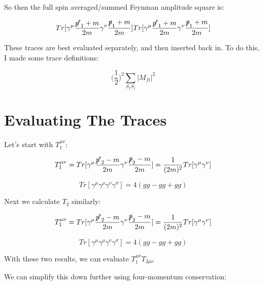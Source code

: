 \documentclass[a4]{article}
\begin{document}
    So then the full spin averaged/summed Feynman amplitude square is:

    \begin{framed}
        \begin{equation}
            Tr [\gamma^\mu \frac{\slashed{p'}_1 + m}{2m} \gamma^\nu \frac{\slashed{p}_1 + m}{2 m}] Tr [\gamma^\mu \frac{\slashed{p'}_1 + m}{2m} \gamma^\nu \frac{\slashed{p}_1 + m}{2 m}]
        \end{equation}
    \end{framed}

    These traces are best evaluated separately, and then inserted back in. To do this, I made some trace definitions:

    \begin{equation}
        \bigg( \frac{1}{2} \bigg)^2 \sum_{S_f S_i} |M_{f i}|^2
    \end{equation}

    \section*{Evaluating The Traces}

    Let's start with $T_1^{\mu \nu}$:

    \begin{equation}
        T_1^{\mu \nu} = Tr [\gamma^\mu \frac{\slashed{p'}_2 - m}{2m} \gamma^\nu \frac{\slashed{p}_2 - m}{2 m}] = \frac{1}{(2m)^2} Tr[\gamma^\mu \gamma^\nu]
    \end{equation}

    \begin{equation}
        Tr [\gamma^\mu \gamma^\rho \gamma^\nu \gamma^\sigma] = 4(g g - g g + g g)
    \end{equation}

    Next we calculate $T_2$ similarly:

    \begin{equation}
        T_1^{\mu \nu} = Tr [\gamma^\mu \frac{\slashed{p'}_2 - m}{2m} \gamma^\nu \frac{\slashed{p}_2 - m}{2 m}] = \frac{1}{(2m)^2} Tr[\gamma^\mu \gamma^\nu]
    \end{equation}

    \begin{equation}
        Tr [\gamma^\mu \gamma^\rho \gamma^\nu \gamma^\sigma] = 4(g g - g g + g g)
    \end{equation}

    With these two results, we can evaluate $T_1^{\mu \nu} T_{2 \mu \nu}$

    We can simplify this down further using four-momentum conservation:
\end{document}

